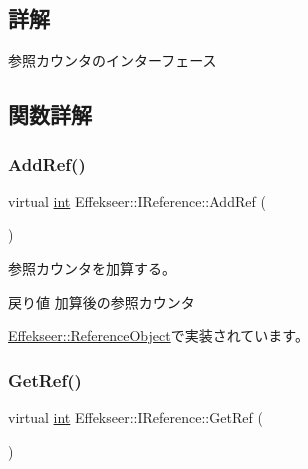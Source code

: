 \subsection{詳解}
参照カウンタのインターフェース 

\subsection{関数詳解}
\mbox{\label{class_effekseer_1_1_i_reference_a3e3b54e8e5081e24f5784e4f9b8f6257}} 
\subsubsection{\texorpdfstring{Add\+Ref()}{AddRef()}}
{\footnotesize\ttfamily virtual \mbox{\hyperlink{namespace_effekseer_ace0abf7c2e6947e519ebe8b54cbcc30a}{int}} Effekseer\+::\+I\+Reference\+::\+Add\+Ref (\begin{DoxyParamCaption}{ }\end{DoxyParamCaption})\hspace{0.3cm}{\ttfamily [pure virtual]}}



参照カウンタを加算する。 

\begin{DoxyReturn}{戻り値}
加算後の参照カウンタ 
\end{DoxyReturn}


\mbox{\hyperlink{class_effekseer_1_1_reference_object_a1cc3feeee39b72aea152ed223dbd0fa7}{Effekseer\+::\+Reference\+Object}}で実装されています。

\mbox{\label{class_effekseer_1_1_i_reference_a95274c788c8c03d27a3e424facc728b6}} 
\subsubsection{\texorpdfstring{Get\+Ref()}{GetRef()}}
{\footnotesize\ttfamily virtual \mbox{\hyperlink{namespace_effekseer_ace0abf7c2e6947e519ebe8b54cbcc30a}{int}} Effekseer\+::\+I\+Reference\+::\+Get\+Ref (\begin{DoxyParamCaption}{ }\end{DoxyParamCaption})\hspace{0.3cm}{\ttfamily [pure virtual]}}



